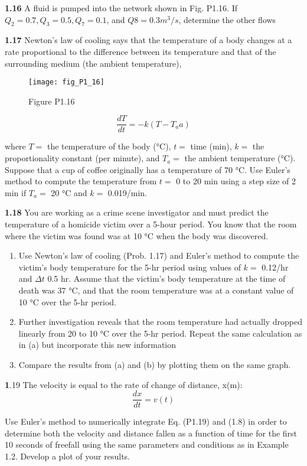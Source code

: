 \documentclass[../main.tex]{subfiles}
\begin{document}
\begin{multicols}{2}
\textbf{1.16} A fluid is pumped into the network shown in Fig. P1.16.
If $Q_2 = 0.7, Q_3 = 0.5, Q_7 = 0.1$, and $Q8 = 0.3 m^3/s$, determine
the other flows


\textbf{1.17} Newton's law of cooling says that the temperature of a
body changes at a rate proportional to the difference between
its temperature and that of the surrounding medium (the ambient temperature),
\begin{figure}[H]
	\centering
	\texttt{[image: fig\_P1\_16]}
   \caption*{Figure P1.16}
   \label{fig_1.}
\end{figure}

$$\dfrac{dT}{dt}= -k(T -T_aa)$$

where $T =$ the temperature of the body (°C), $t =$ time (min),
$k =$ the proportionality constant (per minute), and $T_a =$ the
ambient temperature (°C). Suppose that a cup of coffee originally has a temperature of 70 °C. Use Euler's method to
compute the temperature from $t =$ 0 to 20 min using a step
size of 2 min if $T_a =$ 20 °C and $k =$ 0.019/min.

\textbf{1.18} You are working as a crime scene investigator and
must predict the temperature of a homicide victim over a
5-hour period. You know that the room where the victim was
found was at 10 °C when the body was discovered.
\begin{enumerate}[label=(\alph*)]
	\item Use Newton's law of cooling (Prob. 1.17) and Euler's
	method to compute the victim's body temperature for
	the 5-hr period using values of $k=$  0.12/hr and $\Delta t$
	0.5 hr. Assume that the victim's body temperature at
	the time of death was 37 °C, and that the room temperature was at a constant value of 10 °C over the 5-hr
	period.
	\item Further investigation reveals that the room temperature
	had actually dropped linearly from 20 to 10 °C over the
	5-hr period. Repeat the same calculation as in (a) but incorporate this new information
	\item Compare the results from (a) and (b) by plotting them
	on the same graph. 
\end{enumerate}

\textbf1.19 The velocity is equal to the rate of change of distance,
x(m):
$$\dfrac{dx}{dt} = v(t)$$


Use Euler's method to numerically integrate Eq. (P1.19) and
(1.8) in order to determine both the velocity and distance
fallen as a function of time for the first 10 seconds of freefall
using the same parameters and conditions as in Example 1.2.
Develop a plot of your results.


\end{multicols}
\end{document}
